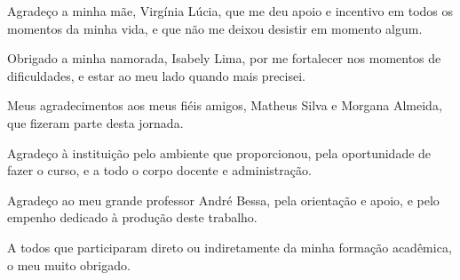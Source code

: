 Agradeço a minha mãe, Virgínia Lúcia, que me deu apoio e incentivo em todos os momentos da
minha vida, e que não me deixou desistir em momento algum.

Obrigado a minha namorada, Isabely Lima, por me fortalecer nos momentos de dificuldades, e
estar ao meu lado quando mais precisei.

Meus agradecimentos aos meus fiéis amigos, Matheus Silva e Morgana Almeida, que fizeram
parte desta jornada.

Agradeço à instituição pelo ambiente que proporcionou, pela oportunidade de fazer o curso,
e a todo o corpo docente e administração.

Agradeço ao meu grande professor André Bessa, pela orientação e apoio, e pelo empenho
dedicado à produção deste trabalho.

A todos que participaram direto ou indiretamente da minha formação acadêmica, o meu muito
obrigado.
